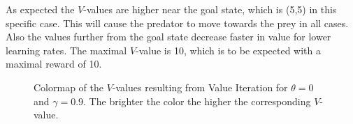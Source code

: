 \documentclass{article}
\begin{document}
As expected the $V$-values are higher near the goal state, which is (5,5) in this specific case. This will cause the predator to move towards the prey in all cases. Also the values further from the goal state decrease faster in value for lower learning rates. The maximal $V$-value is 10, which is to be expected with a maximal reward of 10.

\begin{figure}[htb]
        \caption{\label{colormapValueIteration} Colormap of the $V$-values  resulting from Value 
        		Iteration for $\theta=0$ and $\gamma = 0.9$. \newline
        		The brighter the color the higher the corresponding $V$-value.}
\end{figure}
\end{document}
